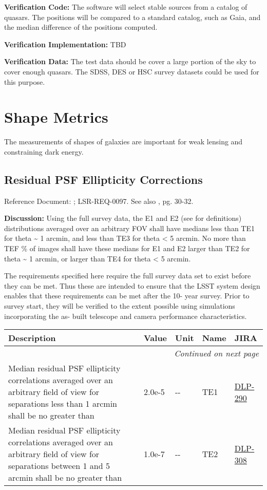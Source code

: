 \documentclass[DM,lsstdraft,toc]{lsstdoc}
\makeatletter
\newcommand{\jira}[1]{\href{https://jira.lsstcorp.org/browse/#1}{#1}}
\newenvironment{metric}[0]{%
\setlength\LTleft{0pt}
\setlength\LTright{\fill}
\begin{longtable}[]{@{}p{0.4\textwidth}lp{0.75in}p{1.3in}p{0.75in}@{}}

\hline \textbf{Description} & \textbf{Value} & \textbf{Unit} & \textbf{Name} & \textbf{JIRA} \\ \hline
\endhead

\hline \multicolumn{5}{r}{\emph{Continued on next page}} \\
\endfoot

\hline\hline
\endlastfoot
}{%
\hline
\end{longtable}
}
\makeatother
\begin{document}
\textbf{Verification Code:} The software will select stable sources from
a catalog of quasars. The positions will be compared to a standard
catalog, such as Gaia, and the median difference of the positions
computed.

\textbf{Verification Implementation:} TBD

\textbf{Verification Data:} The test data should be cover a large
portion of the sky to cover enough quasars. The SDSS, DES or HSC survey
datasets could be used for this purpose.

\section{Shape Metrics}\label{shape-metrics}

The measurements of shapes of galaxies are important for weak lensing
and constraining dark energy.

\subsection{Residual PSF Ellipticity
Corrections}\label{residual-psf-ellipticity-corrections}

Reference Document: ; LSR-REQ-0097. See also \SRD, pg. 30-32.

\textbf{Discussion:} Using the full survey data, the E1 and E2 (see \SRD
for definitions) distributions averaged over an arbitrary FOV shall have
medians less than TE1 for theta \textasciitilde{} 1 arcmin, and less
than TE3 for theta \textless{} 5 arcmin. No more than TEF \% of images
shall have these medians for E1 and E2 larger than TE2 for theta
\textasciitilde{} 1 arcmin, or larger than TE4 for theta \textless{} 5
arcmin.

The requirements specified here require the full survey data set to
exist before they can be met. Thus these are intended to ensure that the
LSST system design enables that these requirements can be met after the
10- year survey. Prior to survey start, they will be verified to the
extent possible using simulations incorporating the as- built telescope
and camera performance characteristics.

\begin{metric}
Median residual PSF ellipticity correlations averaged over an arbitrary
field of view for separations less than 1 arcmin shall be no greater
than & 2.0e-5 & -\/- & TE1 & \jira{DLP-290}\tabularnewline
Median residual PSF ellipticity correlations averaged over an arbitrary
field of view for separations between 1 and 5 arcmin shall be no greater
than & 1.0e-7 & -\/- & TE2 & \jira{DLP-308}\tabularnewline
\end{metric}
\end{document}
